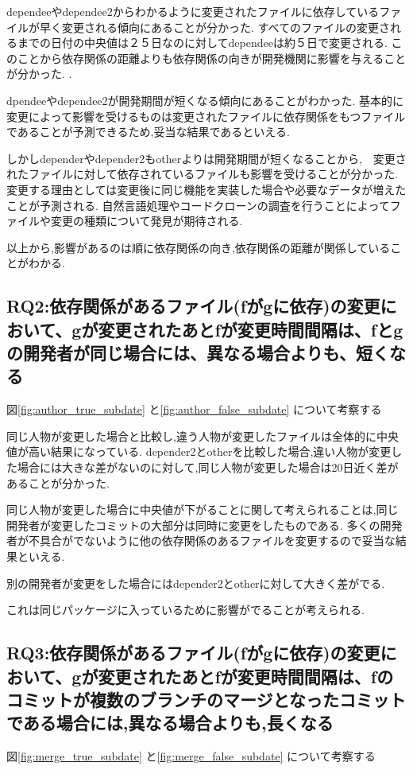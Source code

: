 \documentclass[submit,ses,noauthor]{ipsj} %
\begin{document}
dependeeやdependee2からわかるように変更されたファイルに依存しているファイルが早く変更される傾向にあることが分かった.
すべてのファイルの変更されるまでの日付の中央値は２５日なのに対してdependeeは約５日で変更される.
このことから依存関係の距離よりも依存関係の向きが開発機関に影響を与えることが分かった.
.

dpendeeやdependee2が開発期間が短くなる傾向にあることがわかった.
基本的に変更によって影響を受けるものは変更されたファイルに依存関係をもつファイルであることが予測できるため,妥当な結果であるといえる.

しかしdependerやdepender2もotherよりは開発期間が短くなることから,　変更されたファイルに対して依存されているファイルも影響を受けることが分かった.
変更する理由としては変更後に同じ機能を実装した場合や必要なデータが増えたことが予測される.
自然言語処理やコードクローンの調査を行うことによってファイルや変更の種類について発見が期待される.


以上から,影響があるのは順に依存関係の向き,依存関係の距離が関係していることがわかる.


\subsection{RQ2:依存関係があるファイル(fがgに依存)の変更において、gが変更されたあとfが変更時間間隔は、fとgの開発者が同じ場合には、異なる場合よりも、短くなる}
図\ref{fig:author_true_subdate} と\ref{fig:author_false_subdate} について考察する

同じ人物が変更した場合と比較し,違う人物が変更したファイルは全体的に中央値が高い結果になっている.
depender2とotherを比較した場合,違い人物が変更した場合には大きな差がないのに対して,同じ人物が変更した場合は20日近く差があることが分かった.

同じ人物が変更した場合に中央値が下がることに関して考えられることは,同じ開発者が変更したコミットの大部分は同時に変更をしたものである.
多くの開発者が不具合がでないように他の依存関係のあるファイルを変更するので妥当な結果といえる.

別の開発者が変更をした場合にはdepender2とotherに対して大きく差がでる.

これは同じパッケージに入っているために影響がでることが考えられる.

\subsection{RQ3:依存関係があるファイル(fがgに依存)の変更において、gが変更されたあとfが変更時間間隔は、fのコミットが複数のブランチのマージとなったコミットである場合には,異なる場合よりも,長くなる}
図\ref{fig:merge_true_subdate} と\ref{fig:merge_false_subdate} について考察する
\end{document}
